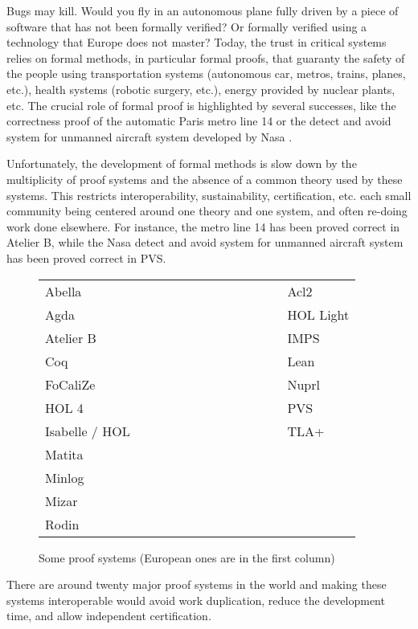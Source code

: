Bugs may kill. Would you fly in an autonomous plane fully driven by a
piece of software that has not been formally verified?  Or formally
verified using a technology that Europe does not master? Today, the
trust in critical systems relies on formal methods, in particular
formal proofs, that guaranty the safety of the people using
transportation systems (autonomous car, metros, trains, planes, etc.),
health systems (robotic surgery, etc.), energy provided by nuclear
plants, etc. The crucial role of formal proof is highlighted by
several successes, like the correctness proof of the automatic Paris
metro line 14 \cite{metro14} or the detect and avoid system for
unmanned aircraft system developed by Nasa \cite{Munoz16}.

Unfortunately, the development of formal methods is slow down by the
multiplicity of proof systems and the absence of a common theory used
by these systems. This restricts interoperability, sustainability,
certification, etc.  each small community being centered around one
theory and one system, and often re-doing work done elsewhere.  For
instance, the metro line 14 has been proved correct in Atelier B,
while the Nasa detect and avoid system for unmanned aircraft system
has been proved correct in PVS.

\begin{figure}
\begin{tabular}{ll}
{\sc Abella}~~~~~~~~~~~~~~~~~~~~~~~~~~~~~~&{\sc Acl2}\\
{\sc Agda}  &  {\sc HOL Light}\\
{\sc Atelier B}  &  {\sc IMPS}\\
{\sc Coq}  &  {\sc Lean}\\
{\sc FoCaliZe}  &  {\sc Nuprl}\\
{\sc HOL 4}  &  {\sc PVS}\\
{\sc Isabelle / HOL}  &  {\sc TLA+}\\
{\sc Matita}\\
{\sc Minlog}\\
{\sc Mizar}\\
{\sc Rodin}\\
\end{tabular}
\caption{Some proof systems (European ones are in the first column)}
\end{figure}

There are around twenty major proof systems in the world and making
these systems interoperable would avoid work duplication, reduce the
development time, and allow independent certification.

